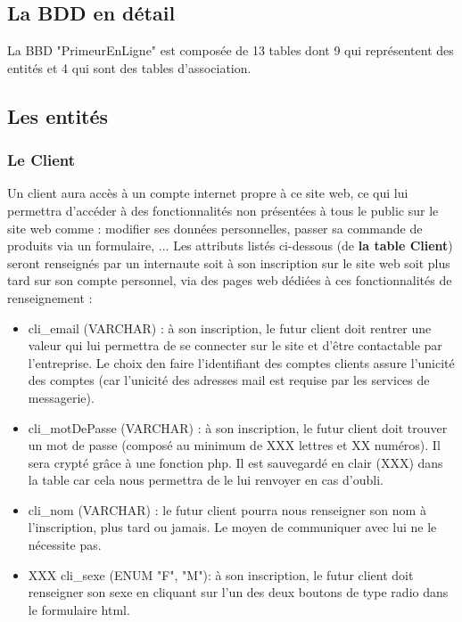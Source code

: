 \documentclass[a4paper, 12pt]{report}
\begin{document}
\begin{spacing}{1.2}
\newpage
\textcolor{colortitre1}{\section*{La BDD en détail}} 

La BBD "PrimeurEnLigne" est composée de 13 tables dont 9 qui représentent des entités et 4 qui sont des tables d'association.

\textcolor{colortitre2}{\subsection*{Les entités}}

\textcolor{colortitre3}{\subsubsection*{Le Client}}
Un client aura accès à un compte internet propre à ce site web, ce qui lui permettra d'accéder à des fonctionnalités non présentées à tous le public sur le site web comme : modifier ses données personnelles, passer sa commande de produits via un formulaire, ...
Les attributs listés ci-dessous (de \textbf{la table Client}) seront renseignés par un internaute soit à son inscription sur le site web soit plus tard sur son compte personnel, via des pages web dédiées à ces fonctionnalités de renseignement :
\begin{itemize}
	\item cli\_email (VARCHAR) : à son inscription, le futur client doit rentrer une valeur qui lui permettra de se connecter sur le site et d'être contactable par l'entreprise. Le choix den faire l'identifiant des comptes clients assure l'unicité des comptes (car l'unicité des adresses mail est requise par les services de messagerie).
	\item cli\_motDePasse (VARCHAR) : à son inscription, le futur client doit trouver un mot de passe (composé au minimum de XXX lettres et XX numéros). Il sera crypté grâce à une fonction php. Il est sauvegardé en clair (XXX) dans la table car cela nous permettra de le lui renvoyer en cas d'oubli.
	\item cli\_nom (VARCHAR) : le futur client pourra nous renseigner son nom à l'inscription, plus tard ou jamais. Le moyen de communiquer avec lui ne le nécessite pas.
	\item XXX cli\_sexe (ENUM {"F", "M"}): à son inscription, le futur client doit renseigner son sexe en cliquant sur l'un des deux boutons de type radio dans le formulaire html.

\end{itemize}
\end{spacing}
\end{document}
